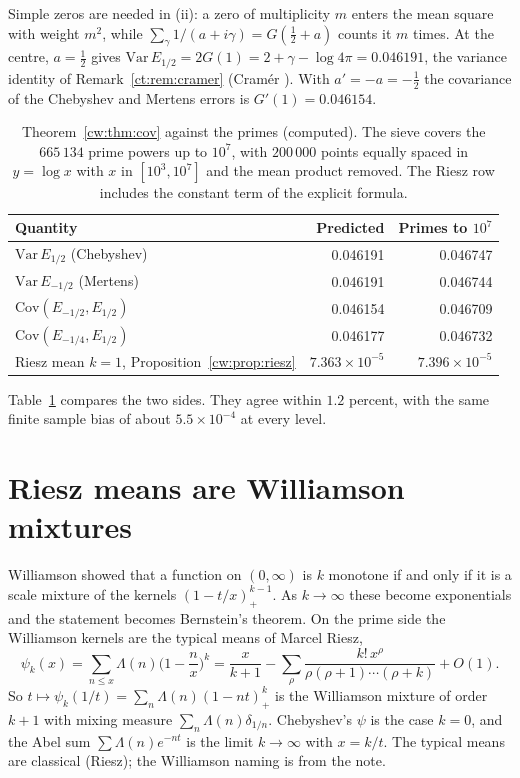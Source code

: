Simple zeros are needed in (ii): a zero of multiplicity $m$ enters the mean square with weight $m^2$, while $\sum_\gamma1/(a+i\gamma)=G(\frac12+a)$ counts it $m$ times. At the centre, $a=\frac12$ gives $\mathrm{Var}\,E_{1/2}=2G(1)=2+\gamma-\log4\pi=0.046191$, the variance identity of Remark~\ref{ct:rem:cramer} (Cram\'er \cite{Cramer}). With $a'=-a=-\frac12$ the covariance of the Chebyshev and Mertens errors is $G'(1)=0.046154$. 

\begin{table}[t]
\centering\small
\begin{tabular}{lrr}
\toprule
Quantity & Predicted & Primes to $10^7$\\
\midrule
$\mathrm{Var}\,E_{1/2}$ (Chebyshev) & 0.046191 & 0.046747\\
$\mathrm{Var}\,E_{-1/2}$ (Mertens) & 0.046191 & 0.046744\\
$\mathrm{Cov}(E_{-1/2},E_{1/2})$ & 0.046154 & 0.046709\\
$\mathrm{Cov}(E_{-1/4},E_{1/2})$ & 0.046177 & 0.046732\\
Riesz mean $k=1$, Proposition~\ref{cw:prop:riesz} & $7.363\times10^{-5}$ & $7.396\times10^{-5}$\\
\bottomrule
\end{tabular}
\caption{Theorem~\ref{cw:thm:cov} against the primes (computed). The sieve covers the $665\,134$ prime powers up to $10^7$, with $200\,000$ points equally spaced in $y=\log x$ with $x$ in $[10^3,10^7]$ and the mean product removed. The Riesz row includes the constant term of the explicit formula.}
\label{cw:tab:cov}
\end{table}

Table~\ref{cw:tab:cov} compares the two sides. They agree within $1.2$ percent, with the same finite sample bias of about $5.5\times10^{-4}$ at every level.

\section{Riesz means are Williamson mixtures}\label{cw:sec:riesz}

Williamson \cite{Williamson} showed that a function on $(0,\infty)$ is $k$ monotone if and only if it is a scale mixture of the kernels $(1-t/x)_+^{k-1}$. As $k\to\infty$ these become exponentials and the statement becomes Bernstein's theorem. On the prime side the Williamson kernels are the typical means of Marcel Riesz,
\[
\psi_k(x)=\sum_{n\le x}\Lambda(n)\Big(1-\frac nx\Big)^k=\frac{x}{k+1}-\sum_\rho\frac{k!\,x^\rho}{\rho(\rho+1)\cdots(\rho+k)}+O(1).
\]
So $t\mapsto\psi_k(1/t)=\sum_n\Lambda(n)(1-nt)_+^k$ is the Williamson mixture of order $k+1$ with mixing measure $\sum_n\Lambda(n)\delta_{1/n}$. Chebyshev's $\psi$ is the case $k=0$, and the Abel sum $\sum\Lambda(n)e^{-nt}$ is the limit $k\to\infty$ with $x=k/t$. The typical means are classical (Riesz); the Williamson naming is from the note.

